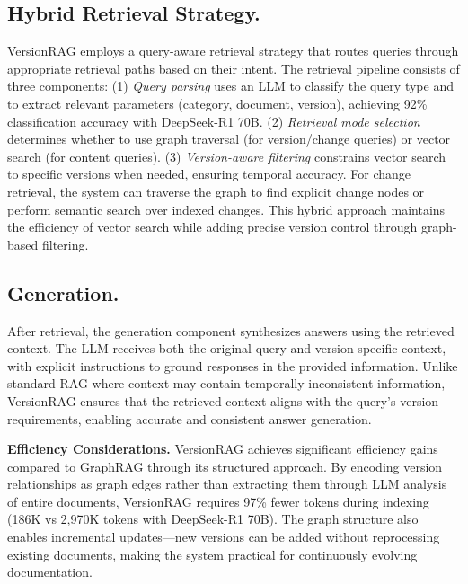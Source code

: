 \subsection{Hybrid Retrieval Strategy.}
VersionRAG employs a query-aware retrieval strategy that routes queries through appropriate retrieval paths based on their intent. The retrieval pipeline consists of three components: (1) \textit{Query parsing} uses an LLM to classify the query type and to extract relevant parameters (category, document, version), achieving 92\% classification accuracy with DeepSeek-R1 70B. (2) \textit{Retrieval mode selection} determines whether to use graph traversal (for version/change queries) or vector search (for content queries). (3) \textit{Version-aware filtering} constrains vector search to specific versions when needed, ensuring temporal accuracy. For change retrieval, the system can traverse the graph to find explicit change nodes or perform semantic search over indexed changes. This hybrid approach maintains the efficiency of vector search while adding precise version control through graph-based filtering.


\subsection{Generation.}
After retrieval, the generation component synthesizes answers using the retrieved context. The LLM receives both the original query and version-specific context, with explicit instructions to ground responses in the provided information. Unlike standard RAG where context may contain temporally inconsistent information, VersionRAG ensures that the retrieved context aligns with the query's version requirements, enabling accurate and consistent answer generation.

\textbf{Efficiency Considerations.}
VersionRAG achieves significant efficiency gains compared to GraphRAG through its structured approach. By encoding version relationships as graph edges rather than extracting them through LLM analysis of entire documents, VersionRAG requires 97\% fewer tokens during indexing (186K vs 2,970K tokens with DeepSeek-R1 70B). The graph structure also enables incremental updates—new versions can be added without reprocessing existing documents, making the system practical for continuously evolving documentation.
